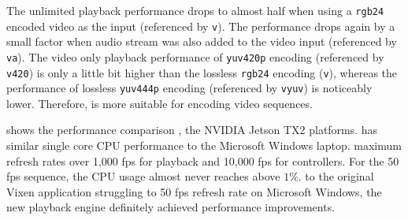 The unlimited playback performance drops to almost half when using a \texttt{rgb24} encoded video as the input (referenced by \texttt{v}). The performance drops again by a small factor when audio stream was also added to the video input (referenced by \texttt{va}). The video only playback performance of \texttt{yuv420p} encoding (referenced by \texttt{v420}) is only a little bit higher than the lossless \texttt{rgb24} encoding (\texttt{v}), whereas the performance of lossless \texttt{yuv444p} encoding (referenced by \texttt{vyuv}) is noticeably lower. Therefore,  is more suitable for encoding video sequences.

  shows the performance comparison ,  the NVIDIA Jetson TX2 platforms.  has  similar single core CPU performance to the Microsoft Windows laptop.  maximum refresh rates  over 1,000 fps for playback and 10,000 fps for controllers. For the 50 fps  sequence, the CPU usage almost never reaches above $1 \%$.  to the original Vixen application struggling to  50 fps refresh rate on Microsoft Windows, the new playback engine definitely achieved  performance improvements.


